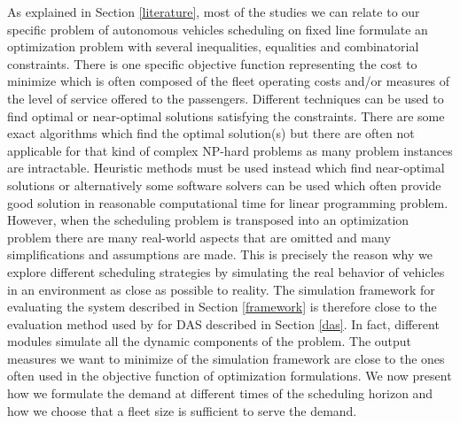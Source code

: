 \documentclass[12pt,a4paper]{article}
\begin{document}
As explained in Section \ref{literature}, most of the studies we can relate to our specific problem of autonomous vehicles scheduling on fixed line formulate an optimization problem with several inequalities, equalities and combinatorial constraints. There is one specific objective function representing the cost to minimize which is often composed of the fleet operating costs and/or measures of the level of service offered to the passengers. Different techniques can be used to find optimal or near-optimal solutions satisfying the constraints. There are some exact algorithms which find the optimal solution(s) but there are often not applicable for that kind of complex NP-hard problems as many problem instances are intractable. Heuristic methods  must be used instead which find near-optimal solutions or alternatively some software solvers can be used which often provide good solution in reasonable computational time for linear programming problem. However, when the scheduling problem is transposed into an optimization problem there are many real-world aspects that are omitted and many simplifications and assumptions are made. This is precisely the reason why we explore different scheduling strategies by simulating the real behavior of vehicles in an environment as close as possible to reality. The simulation framework for evaluating the system described in Section \ref{framework} is therefore close to the evaluation method used by \cite{evaluation} for DAS described in Section \ref{das}. In fact, different modules simulate all the dynamic components of the problem. The output measures we want to minimize of the simulation framework are close to the ones often used in the objective function of optimization formulations. We now present how we formulate the demand at different times of the scheduling horizon and how we choose that a fleet size is sufficient to serve the demand.
\end{document}

